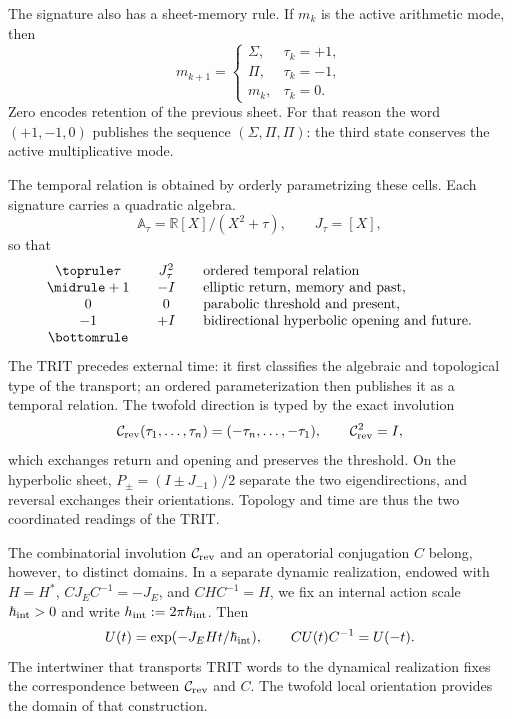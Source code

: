 The signature also has a sheet-memory rule. If \(m_k\) is the active
arithmetic mode, then
\begin{equation}
m_{k+1}=
\begin{cases}
\Sigma,&\tau_k=+1,\\
\Pi,&\tau_k=-1,\\
m_k,&\tau_k=0.
\end{cases}
\label{p12-83-c3-s1:eq:trit-zero-memory}
\end{equation}
Zero encodes retention of the previous sheet. For that reason the word
\((+1,-1,0)\) publishes the sequence \((\Sigma,\Pi,\Pi)\): the third state
conserves the active multiplicative mode.

The temporal relation is obtained by orderly parametrizing these cells.
Each signature carries a quadratic algebra.
\begin{equation}
\mathbb A_\tau=\mathbb R[X]/(X^2+\tau),
\qquad J_\tau=[X],
\label{p12-83-c3-s1:eq:trit-quadratic-algebra-local}
\end{equation}
so that
\[
\begin{array}{c@{\qquad}c@{\qquad}l}
\toprule
\tau & J_\tau^2 & \text{ordered temporal relation}\\
\midrule
+1 & -I & \text{elliptic return, memory and past},\\
0  & 0  & \text{parabolic threshold and present},\\
-1 & +I & \text{bidirectional hyperbolic opening and future}.\\
\bottomrule
\end{array}
\]
The TRIT precedes external time: it first classifies the algebraic and
topological type of the transport; an ordered parameterization then publishes it
as a temporal relation. The twofold direction is typed by the exact involution
\begin{equation}
\mathcal C_{\rm rev}(\tau_1,\ldots,\tau_n)
=(-\tau_n,\ldots,-\tau_1),
\qquad \mathcal C_{\rm rev}^2=I,
\label{p12-83-c3-s1:eq:trit-time-reversal}
\end{equation}
which exchanges return and opening and preserves the threshold. On the
hyperbolic sheet, \(P_\pm=(I\pm J_{-1})/2\) separate the two eigendirections, and
reversal exchanges their orientations. Topology and time are thus the two
coordinated readings of the TRIT.

The combinatorial involution \(\mathcal C_{\rm rev}\) and an operatorial
conjugation \(C\) belong, however, to distinct domains. In a
separate dynamic realization, endowed with \(H=H^*\),
\(CJ_EC^{-1}=-J_E\), and \(CHC^{-1}=H\), we fix an internal action scale
\(\hbar_{\rm int}>0\) and write
\(h_{\rm int}:=2\pi\hbar_{\rm int}\). Then
\begin{equation}
U(t)=\exp(-J_EHt/\hbar_{\rm int}),
\qquad CU(t)C^{-1}=U(-t).
\label{p12-83-c3-s1:eq:trit-bidirectional-propagator}
\end{equation}
The intertwiner that transports TRIT words to the dynamical realization fixes
the correspondence between \(\mathcal C_{\rm rev}\) and \(C\). The twofold
local orientation provides the domain of that construction.

